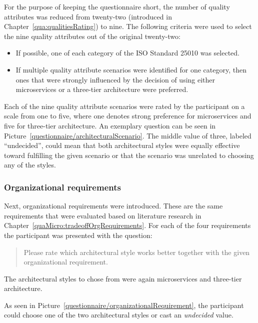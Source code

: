 For the purpose of keeping the questionnaire short, the number of quality attributes was reduced from twenty-two (introduced in Chapter~\ref{qua:qualitiesRating}) to nine.
The following criteria were used to select the nine quality attributes out of the original twenty-two:
\begin{itemize}
\item If possible, one of each category of the ISO Standard 25010 \cite{ISO25010} was selected.
\item If multiple quality attribute scenarios were identified for one category, then ones that were strongly influenced by the decision of using either microservices or a three-tier architecture were preferred.
\end{itemize}

Each of the nine quality attribute scenarios were rated by the participant on a scale from one to five, where one denotes strong preference for microservices and five for three-tier architecture.
An exemplary question can be seen in Picture~\ref{questionnaire/architecturalScenario}. 
The middle value of three, labeled ``undecided'', could mean that both architectural styles were equally effective toward fulfilling the given scenario or that the scenario was unrelated to choosing any of the styles.

\subsubsection{Organizational requirements}
\label{questionnaire:orgQualities}
Next, organizational requirements were introduced.
These are the same requirements that were evaluated based on literature research in Chapter~\ref{quaMicro:tradeoffOrgRequirements}.
For each of the four requirements the participant was presented with the question:
\begin{quote}
Please rate which architectural style works better together with the given organizational requirement.
\end{quote}
The architectural styles to chose from were again microservices and three-tier architecture.

As seen in Picture~\ref{questionnaire/organizationalRequirement}, the participant could choose one of the two architectural styles or cast an \textit{undecided} value.

